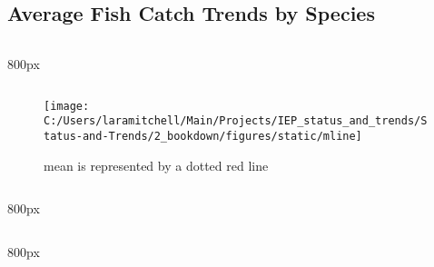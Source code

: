 \documentclass[
]{book}
\begin{document}
\hypertarget{average-fish-catch-trends-by-species}{%
\subsection{Average Fish Catch Trends by Species}\label{average-fish-catch-trends-by-species}}

\begin{columns-nocenter}

\begin{column}{800px\textwidth}
\begin{column}

\begin{figure}
\texttt{[image: C:/Users/laramitchell/Main/Projects/IEP\_status\_and\_trends/Status-and-Trends/2\_bookdown/figures/static/mline]} \caption{mean is represented by a dotted red line}\label{fig:unnamed-chunk-169}
\end{figure}

\end{column}
\end{column}

\begin{column}{800px\textwidth}
\begin{column}

\end{column}
\end{column}

\begin{column}{800px\textwidth}
\begin{column}

\end{column}
\end{column}

\end{columns-nocenter}
\end{document}
